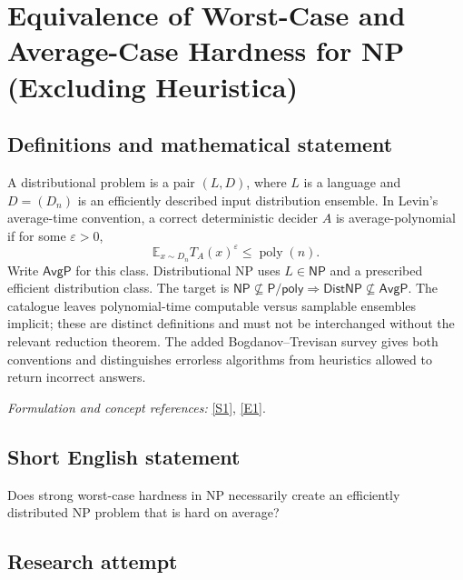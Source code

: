 \documentclass[11pt]{article}
\newcommand{\sref}[2]{\hyperlink{source:#1:#2}{[S#2]}}
\newcommand{\eref}[2]{\hyperlink{extra:#1:#2}{[E#2]}}
\newif\ifshowcatalogue
\newcommand{\cataloguescope}[1]{\ifshowcatalogue
 \paragraph{Exact scope in the supplied catalogue.}
 \begin{quote}\small #1\end{quote}\fi}
\begin{document}
\setcounter{section}{0}
\clearpage
\section*{\texorpdfstring{Equivalence of Worst-Case and Average-Case Hardness for NP (Excluding Heuristica)}{Equivalence of Worst-Case and Average-Case Hardness for NP (Excluding Heuristica)}}\label{statement}
\subsection{Definitions and mathematical statement}
A distributional problem is a pair $(L,D)$, where $L$ is a language and $D=(D_n)$ is an efficiently described input distribution ensemble. In Levin's average-time convention, a correct deterministic decider $A$ is average-polynomial if for some $\varepsilon>0$,
\[
 \mathbb E_{x\sim D_n} T_A(x)^\varepsilon\le\operatorname{poly}(n).
\]
Write $\mathsf{AvgP}$ for this class. Distributional NP uses $L\in\mathsf{NP}$ and a prescribed efficient distribution class. The target is $\mathsf{NP}\nsubseteq\mathsf{P/poly}\Rightarrow\mathsf{DistNP}\nsubseteq\mathsf{AvgP}$. The catalogue leaves polynomial-time computable versus samplable ensembles implicit; these are distinct definitions and must not be interchanged without the relevant reduction theorem. The added Bogdanov--Trevisan survey gives both conventions and distinguishes errorless algorithms from heuristics allowed to return incorrect answers.
\par\smallskip\textit{Formulation and concept references:} \sref{statement}{1}, \eref{statement}{1}.
\cataloguescope{Prove or disprove that if NP is hard in the worst case (NP not in P/poly), then NP is hard on average (DistNP not in AvgP).}
\subsection{Short English statement}
Does strong worst-case hardness in NP necessarily create an efficiently distributed NP problem that is hard on average?
\subsection{Research attempt}
\end{document}
